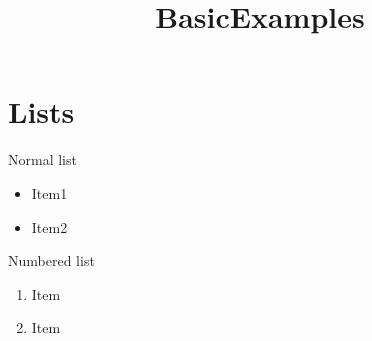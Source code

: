 \documentclass[]{article}
\title{BasicExamples}
\author{}
\begin{document}
	\maketitle
	
	
\section{Lists}
Normal list
\begin{itemize}
	\item Item1
	\item Item2
\end{itemize}
Numbered list
\begin{enumerate}
	\item Item
	\item Item
\end{enumerate}
\end{document}
